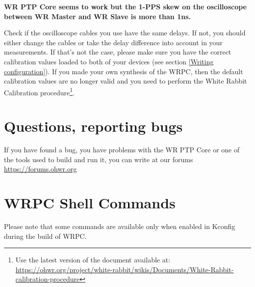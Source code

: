 \documentclass[a4paper, 12pt]{article}
\renewcommand{\_}{\underscore\allowbreak}
\begin{document}
\noindent \textbf{WR PTP Core seems to work but the 1-PPS skew on the
oscilloscope between WR Master and WR Slave is more than 1ns.}

Check if the oscilloscope cables you use have the same delays. If not, you
should either change the cables or take the delay difference into account in your
measurements. If that's not the case, please make sure you have the correct
calibration values loaded to both of your devices (see section \ref{Writing
configuration}). If you made your own synthesis of the WRPC, then the default
calibration values are no longer valid and you need to perform the White Rabbit
Calibration procedure\footnote{Use the latest version of the document available
at: \url{https://ohwr.org/project/white-rabbit/wikis/Documents/White-Rabbit-calibration-procedure}}.

\section{Questions, reporting bugs}
\label{Questions}

If you have found a bug, you have problems with the WR PTP Core or one of the
tools used to build and run it, you can write at our forums
\url{https://forums.ohwr.org}




\clearpage
\appendix
\appendixpage
\section{WRPC Shell Commands}
\label{WRPC Shell commands}

Please note that some commands are available only when enabled in Kconfig during
the build of WRPC.

\renewcommand{\descriptionlabel}[1]{\texttt{#1}}
\end{document}
